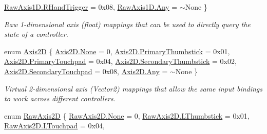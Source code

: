 \begin{DoxyCompactItemize}
\newline
\mbox{\hyperlink{class_o_v_r_input_a9c9eff2910ca07d1fb0e924273ebefafa2d5b73bea84840ebcd86393266fb601d}{Raw\+Axis1\+D.\+R\+Hand\+Trigger}} = 0x08, 
\mbox{\hyperlink{class_o_v_r_input_a9c9eff2910ca07d1fb0e924273ebefafaed36a1ef76a59ee3f15180e0441188ad}{Raw\+Axis1\+D.\+Any}} = $\sim$\+None
 \}
\begin{DoxyCompactList}\small\item\em Raw 1-\/dimensional axis (float) mappings that can be used to directly query the state of a controller. \end{DoxyCompactList}\item 
enum \mbox{\hyperlink{class_o_v_r_input_a8d8de8321e36e4c5c3b5266b72468d8a}{Axis2D}} \{ \newline
\mbox{\hyperlink{class_o_v_r_input_a8d8de8321e36e4c5c3b5266b72468d8aa6adf97f83acf6453d4a6a4b1070f3754}{Axis2\+D.\+None}} = 0, 
\mbox{\hyperlink{class_o_v_r_input_a8d8de8321e36e4c5c3b5266b72468d8aa44e853762529750fc9e2c3dfdbda6173}{Axis2\+D.\+Primary\+Thumbstick}} = 0x01, 
\mbox{\hyperlink{class_o_v_r_input_a8d8de8321e36e4c5c3b5266b72468d8aaf7efa4c905fcd3de5fabbb80e316f797}{Axis2\+D.\+Primary\+Touchpad}} = 0x04, 
\mbox{\hyperlink{class_o_v_r_input_a8d8de8321e36e4c5c3b5266b72468d8aa4cfe69061380abb7e3b7f1d21e633600}{Axis2\+D.\+Secondary\+Thumbstick}} = 0x02, 
\newline
\mbox{\hyperlink{class_o_v_r_input_a8d8de8321e36e4c5c3b5266b72468d8aa177ba2bf42c325826c45d82357fc9e70}{Axis2\+D.\+Secondary\+Touchpad}} = 0x08, 
\mbox{\hyperlink{class_o_v_r_input_a8d8de8321e36e4c5c3b5266b72468d8aaed36a1ef76a59ee3f15180e0441188ad}{Axis2\+D.\+Any}} = $\sim$\+None
 \}
\begin{DoxyCompactList}\small\item\em Virtual 2-\/dimensional axis (Vector2) mappings that allow the same input bindings to work across different controllers. \end{DoxyCompactList}\item 
enum \mbox{\hyperlink{class_o_v_r_input_a973c161bfb3bd6d0cc16c3a0b56c9f4a}{Raw\+Axis2D}} \{ \newline
\mbox{\hyperlink{class_o_v_r_input_a973c161bfb3bd6d0cc16c3a0b56c9f4aa6adf97f83acf6453d4a6a4b1070f3754}{Raw\+Axis2\+D.\+None}} = 0, 
\mbox{\hyperlink{class_o_v_r_input_a973c161bfb3bd6d0cc16c3a0b56c9f4aa60bb23d20b84538d31231081472ba86c}{Raw\+Axis2\+D.\+L\+Thumbstick}} = 0x01, 
\mbox{\hyperlink{class_o_v_r_input_a973c161bfb3bd6d0cc16c3a0b56c9f4aa7c0bd966a0e7a99323b6fd18efef7602}{Raw\+Axis2\+D.\+L\+Touchpad}} = 0x04, 

\end{DoxyCompactItemize}
